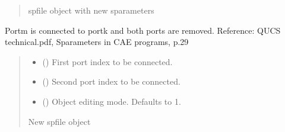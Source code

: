 \documentclass[letterpaper,10pt,english]{sphinxmanual}
\begin{document}
\begin{fulllineitems}
\begin{fulllineitems}
\begin{quote}
\begin{description}
\begin{itemize}
\end{itemize}

\sphinxAtStartPar
spfile object with new s\sphinxhyphen{}parameters

\end{description}\end{quote}

\end{fulllineitems}


\begin{fulllineitems}
\label{\detokenize{touchstone:touchstone.spfile.connect_2_ports}}
\pysigstartsignatures
{}
\pysigstopsignatures
\sphinxAtStartPar
Port\sphinxhyphen{}m is connected to port\sphinxhyphen{}k and both ports are removed.
Reference: QUCS technical.pdf, S\sphinxhyphen{}parameters in CAE programs, p.29
\begin{quote}\begin{description}
\begin{itemize}
\item {}
\sphinxAtStartPar
{} () \textendash{} First port index to be connected.

\item {}
\sphinxAtStartPar
{} () \textendash{} Second port index to be connected.

\item {}
\sphinxAtStartPar
{} (\sphinxstyleliteralemphasis{\sphinxupquote{, }}) \textendash{} Object editing mode. Defaults to \sphinxhyphen{}1.

\end{itemize}

\sphinxAtStartPar
New spfile object

\sphinxAtStartPar
{\hyperref[\detokenize{touchstone:touchstone.spfile}]{}}


\end{description}
\end{quote}
\end{fulllineitems}
\end{fulllineitems}
\end{document}
